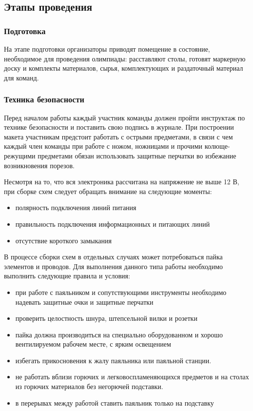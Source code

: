 \subsection*{Этапы проведения}

\subsubsection*{Подготовка}

На этапе подготовки организаторы приводят помещение в состояние, необходимое для проведения олимпиады: расставляют столы, готовят маркерную доску и комплекты материалов, сырья, комплектующих и раздаточный материал для команд.

\subsubsection*{Техника безопасности}

Перед началом работы каждый участник команды должен пройти инструктаж по технике безопасности и поставить свою подпись в журнале. При построении макета участникам предстоит работать с острыми предметами, в связи с чем каждый член команды при работе с ножом, ножницами и прочими колюще-режущими предметами обязан использовать защитные перчатки во избежание возникновения порезов.

Несмотря на то, что вся электроника рассчитана на напряжение не выше 12 В, при сборке схем следует обращать внимание на следующие моменты:
\begin{itemize}
    \item полярность подключения линий питания
    \item правильность подключения информационных и питающих линий
    \item отсутствие короткого замыкания    
\end{itemize}

В процессе сборки схем в отдельных случаях может потребоваться пайка элементов и проводов. Для выполнения данного типа работы необходимо выполнить следующие правила и условия:
\begin{itemize}
    \item при работе с паяльником и сопутствующими инструменты необходимо надевать защитные очки и защитные перчатки
    \item проверить целостность шнура, штепсельной вилки и розетки
    \item пайка должна производиться на специально оборудованном и хорошо вентилируемом рабочем месте, с ярким освещением
    \item избегать прикосновения к жалу паяльника или паяльной станции.
    \item не работать вблизи горючих и легковоспламеняющихся предметов и на столах из горючих материалов без негорючей подставки.
    \item в перерывах между работой ставить паяльник только на подставку    
\end{itemize}

